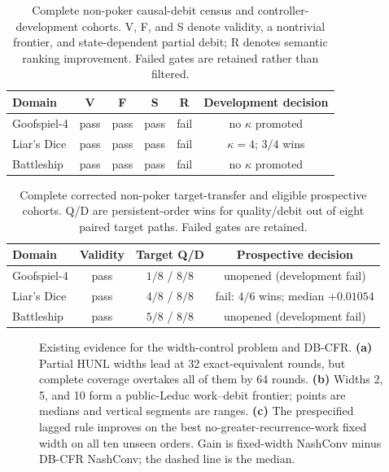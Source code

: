 \begin{table}[H]
  \caption{Complete non-poker causal-debit census and controller-development
  cohorts.  V, F, and S denote validity, a nontrivial frontier, and
  state-dependent partial debit; R denotes semantic ranking improvement.
  Failed gates are retained rather than filtered.}
  \label{tab:nonpoker-debit}
  \centering
  \footnotesize
  \setlength{\tabcolsep}{4pt}
  \begin{tabular}{@{}lccccc@{}}
    \toprule
    Domain & V & F & S & R & Development decision \\
    \midrule
    Goofspiel-4 & pass & pass & pass & fail & no $\kappa$ promoted \\
    Liar's Dice & pass & pass & pass & fail & $\kappa=4$; $3/4$ wins \\
    Battleship & pass & pass & pass & fail & no $\kappa$ promoted \\
    \bottomrule
  \end{tabular}
\end{table}

\begin{table}[H]
  \caption{Complete corrected non-poker target-transfer and eligible
  prospective cohorts.  Q/D are persistent-order wins for quality/debit out
  of eight paired target paths.  Failed gates are retained.}
  \label{tab:nonpoker-target}
  \centering
  \footnotesize
  \setlength{\tabcolsep}{4pt}
  \begin{tabular}{@{}lccc@{}}
    \toprule
    Domain & Validity & Target Q/D & Prospective decision \\
    \midrule
    Goofspiel-4 & pass & $1/8$ / $8/8$ & unopened (development fail) \\
    Liar's Dice & pass & $4/8$ / $8/8$ & fail: $4/6$ wins; median $+0.01054$ \\
    Battleship & pass & $5/8$ / $8/8$ & unopened (development fail) \\
    \bottomrule
  \end{tabular}
\end{table}

\begin{figure}[t]
\centering

\caption{Existing evidence for the width-control problem and DB-CFR.
\textbf{(a)} Partial HUNL widths lead at 32 exact-equivalent rounds, but
complete coverage overtakes all of them by 64 rounds.  \textbf{(b)} Widths 2,
5, and 10 form a public-Leduc work--debit frontier; points are medians and
vertical segments are ranges.  \textbf{(c)} The prespecified lagged rule improves on
the best no-greater-recurrence-work fixed width on all ten unseen orders.  Gain
is fixed-width NashConv minus DB-CFR NashConv; the dashed line is the median.}
\label{fig:db-cfr-evidence}
\end{figure}

